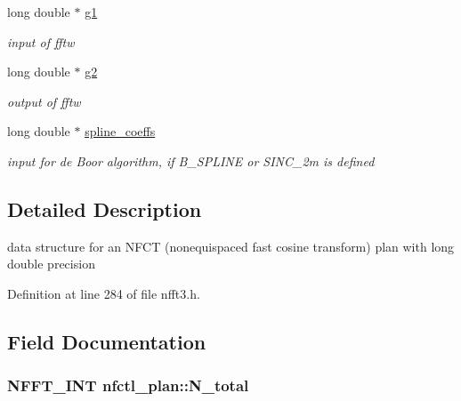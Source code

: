 \begin{DoxyCompactItemize}
\item 
\hypertarget{structnfctl__plan_afbe6522294161b247058e61e9ef64d78}{long double $\ast$ \hyperlink{structnfctl__plan_afbe6522294161b247058e61e9ef64d78}{g1}}\label{structnfctl__plan_afbe6522294161b247058e61e9ef64d78}

\begin{DoxyCompactList}\small\item\em input of fftw \end{DoxyCompactList}\item 
\hypertarget{structnfctl__plan_a365bf7b6d6fa04bfb4206f8ec647eb14}{long double $\ast$ \hyperlink{structnfctl__plan_a365bf7b6d6fa04bfb4206f8ec647eb14}{g2}}\label{structnfctl__plan_a365bf7b6d6fa04bfb4206f8ec647eb14}

\begin{DoxyCompactList}\small\item\em output of fftw \end{DoxyCompactList}\item 
\hypertarget{structnfctl__plan_a38de3cc7a337907a01ae2701ea335d75}{long double $\ast$ \hyperlink{structnfctl__plan_a38de3cc7a337907a01ae2701ea335d75}{spline\-\_\-coeffs}}\label{structnfctl__plan_a38de3cc7a337907a01ae2701ea335d75}

\begin{DoxyCompactList}\small\item\em input for de Boor algorithm, if B\-\_\-\-S\-P\-L\-I\-N\-E or S\-I\-N\-C\-\_\-2m is defined \end{DoxyCompactList}\end{DoxyCompactItemize}


\subsection{Detailed Description}
data structure for an N\-F\-C\-T (nonequispaced fast cosine transform) plan with long double precision 

Definition at line 284 of file nfft3.\-h.



\subsection{Field Documentation}
\hypertarget{structnfctl__plan_affb9b7c2d4e7c5b37954ec7f2e040842}{
\subsubsection[{N\-\_\-total}]{\setlength{\rightskip}{0pt plus 5cm}N\-F\-F\-T\-\_\-\-I\-N\-T nfctl\-\_\-plan\-::\-N\-\_\-total}}\label{structnfctl__plan_affb9b7c2d4e7c5b37954ec7f2e040842}


